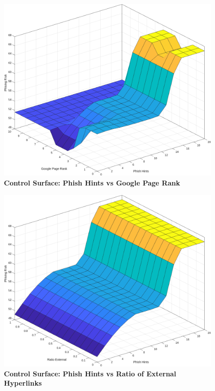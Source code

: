\documentclass[11pt]{article}
\begin{document}
\begin{appendices}
\begin{figure}[H]
\begin{minipage}{0.45\textwidth}
    \end{minipage}
    \vspace{0.5cm}
\end{figure}
\begin{figure}[H]
    \begin{minipage}{0.45\textwidth}
        \includegraphics[width=\textwidth]{surface_plots/phish_hints_google_page_rank.png}
        \centering
        \textbf{Control Surface: Phish Hints vs Google Page Rank}
    \end{minipage}
    \hfill
    \begin{minipage}{0.45\textwidth}
        \includegraphics[width=\textwidth]{surface_plots/phish_hints_ratio_external.png}
        \centering
        \textbf{Control Surface: Phish Hints vs Ratio of External Hyperlinks}
    \end{minipage}
    \vspace{0.5cm}
    

\end{figure}
\end{appendices}
\end{document}
